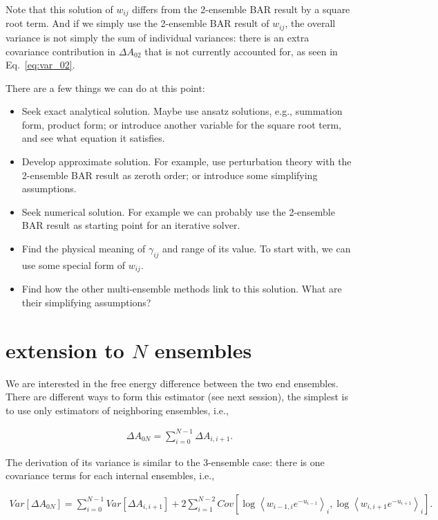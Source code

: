 \documentclass[notitlepage, amsmath, amssymb, aps]{revtex4-1}
\begin{document}
Note that this solution of $w_{ij}$ differs from the 2-ensemble BAR result by a square root term.
And if we simply use the 2-ensemble BAR result of $w_{ij}$,
the overall variance is not simply the sum of individual variances:
there is an extra covariance contribution in $\Delta A_{02}$ that is not currently accounted for, as seen in Eq.~\ref{eq:var_02}.

There are a few things we can do at this point:

\begin{itemize}
    \item Seek exact analytical solution. Maybe use ansatz solutions, e.g., summation form, product form; or introduce another variable for the square root term, and see what equation it satisfies.
    \item Develop approximate solution. For example, use perturbation theory with the 2-ensemble BAR result as zeroth order; or introduce some simplifying assumptions.
    \item Seek numerical solution. For example we can probably use the 2-ensemble BAR result as starting point for an iterative solver.
    \item Find the physical meaning of $\gamma_{ij}$ and range of its value. To start with, we can use some special form of $w_{ij}$.
    \item Find how the other multi-ensemble methods link to this solution. What are their simplifying assumptions?
\end{itemize}

\section{extension to $N$ ensembles}

We are interested in the free energy difference between the two end ensembles.
There are different ways to form this estimator (see next session),
the simplest is to use only estimators of neighboring ensembles, i.e.,

\begin{align}
    \Delta A_{0N} = \sum_{i=0}^{N-1}\Delta A_{i,i+1}.
\end{align}

The derivation of its variance is similar to the 3-ensemble case:
there is one covariance terms for each internal ensembles, i.e.,

\begin{align}
    Var[\Delta A_{0N}] = \sum_{i=0}^{N-1}Var[\Delta A_{i,i+1}] 
    + 2\sum_{i=1}^{N-2}Cov[\log\left<w_{i-1,i}e^{-u_{i-1}}\right>_i, \log\left<w_{i, i+1}e^{-u_{i+1}}\right>_i].
\end{align}
\end{document}
